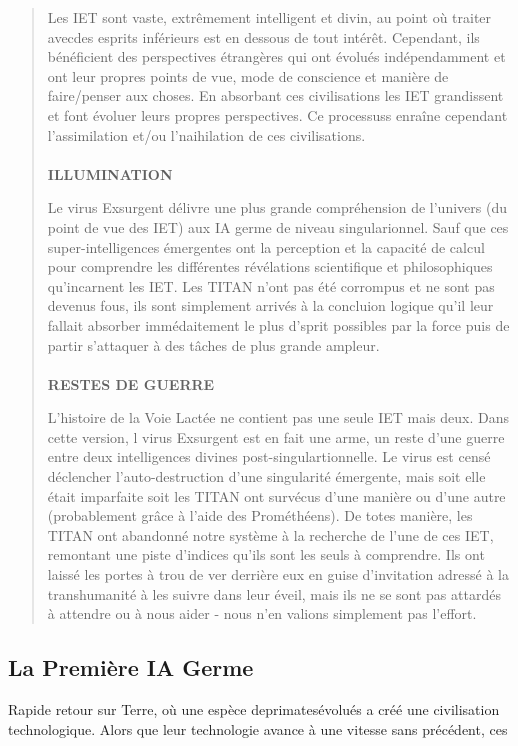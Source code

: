 \begin{quotation}
Les IET sont vaste, extrêmement intelligent et divin, au point où traiter avecdes esprits inférieurs est en dessous de tout intérêt. Cependant, ils bénéficient des perspectives étrangères qui ont évolués indépendamment et ont leur propres points de vue, mode de conscience et manière de faire/penser aux choses. En absorbant ces civilisations les IET grandissent et font évoluer leurs propres perspectives. Ce processuss enraîne cependant l'assimilation et/ou l'naihilation de ces civilisations. \\ \\ \textbf{ILLUMINATION} 

Le virus Exsurgent délivre une plus grande compréhension de l'univers (du point de vue des IET) aux IA germe de niveau singularionnel. Sauf que ces super-intelligences émergentes ont la perception et la capacité de calcul pour comprendre les différentes révélations scientifique et philosophiques qu'incarnent les IET. Les TITAN n'ont pas été corrompus et ne sont pas devenus fous, ils sont simplement arrivés à la concluion logique qu'il leur fallait absorber immédaitement le plus d'sprit possibles par la force puis de partir s'attaquer à des tâches de plus grande ampleur. \\ \\ \textbf{RESTES DE GUERRE} 

L'histoire de la Voie Lactée ne contient pas une seule IET mais deux. Dans cette version, l virus Exsurgent est en fait une arme, un reste d'une guerre entre deux intelligences divines post-singulartionnelle. Le virus est censé déclencher l'auto-destruction d'une singularité émergente, mais soit elle était imparfaite soit les TITAN ont survécus d'une manière ou d'une autre (probablement grâce à l'aide des Prométhéens). De totes manière, les TITAN ont abandonné notre système à la recherche de l'une de ces IET, remontant une piste d'indices qu'ils sont les seuls à comprendre. Ils ont laissé les portes à trou de ver derrière eux en guise d'invitation adressé à la transhumanité à les suivre dans leur éveil, mais ils ne se sont pas attardés à attendre ou à nous aider - nous n'en valions simplement pas l'effort. \end{quotation} 



\subsection{La Première IA Germe} 

Rapide retour sur Terre, où une espèce deprimatesévolués a créé une civilisation technologique. Alors que leur technologie avance à une vitesse sans précédent, ces 

